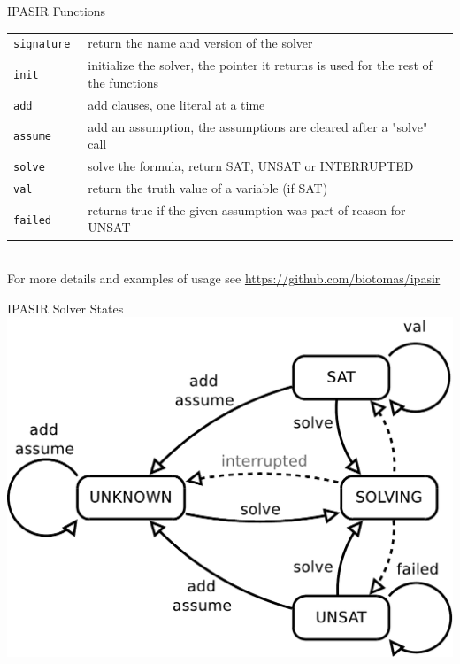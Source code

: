 \documentclass[t]{sdqbeamer}
\begin{document}
\begin{frame}{IPASIR Functions}
	\def\arraystretch{1.5}
	\begin{tabularx}{\textwidth}{lX}
		\tt signature 	& return the name and version of the solver\\
		\tt init    	& initialize the solver, the pointer it returns is used for the rest of the functions\\
		\tt add 		& add clauses, one literal at a time\\
		\tt assume 		& add an assumption, the assumptions are cleared after a "solve" call\\
		\tt solve 		& solve the formula, return SAT, UNSAT or INTERRUPTED\\
		\tt val 		& return the truth value of a variable (if SAT)\\
		\tt failed 		& returns true if the given assumption was part of reason for UNSAT\\
	\end{tabularx}~\\[1em]
	For more details and examples of usage see \url{https://github.com/biotomas/ipasir}
\end{frame}

\begin{frame}{IPASIR Solver States}
\centering
\includegraphics[height=.75\textheight]{figures/l01/ipasir.pdf}
\end{frame}
\end{document}
